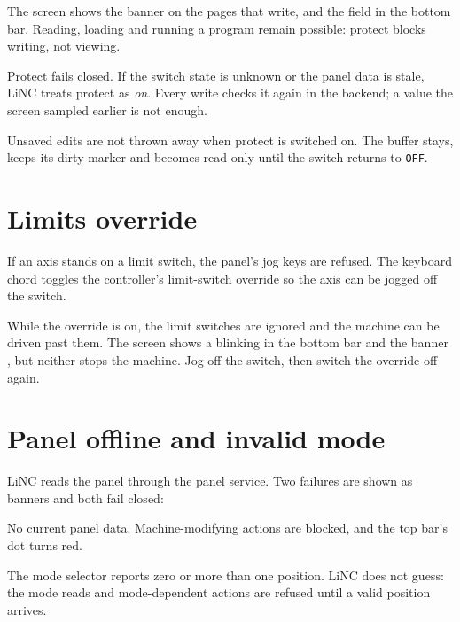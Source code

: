 The screen shows the banner  on the pages that write,
and the field  in the bottom bar. Reading, loading and running a program
remain possible: protect blocks writing, not viewing.

\begin{notebox}
  Protect fails closed. If the switch state is unknown or the panel data is stale, LiNC
  treats protect as \emph{on}. Every write checks it again in the backend; a value the
  screen sampled earlier is not enough.
\end{notebox}

Unsaved edits are not thrown away when protect is switched on. The buffer stays, keeps
its dirty marker and becomes read-only until the switch returns to \texttt{OFF}.

\section{Limits override}

If an axis stands on a limit switch, the panel's jog keys are refused. The keyboard chord
 toggles the controller's limit-switch override so
the axis can be jogged off the switch.

\begin{cautionbox}
  While the override is on, the limit switches are ignored and the machine can be driven
  past them. The screen shows a blinking  in the bottom bar and
  the banner , but neither
  stops the machine. Jog off the switch, then switch the override off again.
\end{cautionbox}

\section{Panel offline and invalid mode}

LiNC reads the panel through the panel service. Two failures are shown as banners and
both fail closed:

\begin{description}[font=\normalfont\sffamily\bfseries, leftmargin=4.2cm, style=nextline]
  \item[\state{PANEL OFFLINE}] No current panel data. Machine-modifying actions are
        blocked, and the top bar's  dot turns red.
  \item[\state{PANEL MODE INVALID}] The mode selector reports zero or more than one
        position. LiNC does not guess: the mode reads  and mode-dependent
        actions are refused until a valid position arrives.
\end{description}

